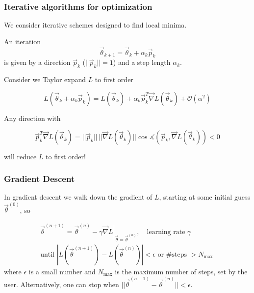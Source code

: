 \subsubsection{Iterative algorithms for optimization}

We consider iterative schemes designed to find local minima.

An iteration
\begin{equation}
    \vec{\theta}_{k+1} = \vec{\theta}_k + \alpha_k \vec{p}_k
\end{equation}
is given by a direction $\vec{p}_k$ ($||\vec{p}_k|| = 1$) and a step length $\alpha_k$.


Consider we Taylor expand $L$ to first order

\begin{equation}
    L(\vec{\theta}_k + \alpha_k \vec{p}_k) = L(\vec{\theta}_k) + \alpha_k \vec{p}_k^T \vec{\nabla} L(\vec{\theta}_k) + \mathcal{O}(\alpha^2)
\end{equation}

Any direction with

\begin{equation}
    \vec{p}_k^T \vec{\nabla} L(\vec{\theta}_k) = ||\vec{p}_k|| \, ||\vec{\nabla} L(\vec{\theta}_k)|| \cos{\measuredangle \left(\vec{p}_k, \vec{\nabla} L(\vec{\theta}_k)\right)} < 0
\end{equation}

will reduce $L$ to first order!

\subsubsection{Gradient Descent}


In gradient descent we walk down the gradient of $L$, starting at some initial guess $\vec{\theta}^{(0)}$, so

\begin{equation}
    \begin{gathered}
        \vec{\theta}^{(n+1)}=\vec{\theta}^{(n)}-\left.\gamma \vec{\nabla} L\right|_{\vec{\theta}=\vec{\theta}^{(n)}}, \quad \text{learning rate } \gamma \\
        \text{until } \left|L\left(\vec{\theta}^{(n+1)}\right)-L\left(\vec{\theta}^{(n)}\right)\right|<\epsilon \text{ or \# steps } >N_{\text {max }}
    \end{gathered}
\end{equation}
where $\epsilon$ is a small number and $N_{\text{max}}$ is the maximum number of steps, set by
the user. Alternatively, one can stop when $||\vec{\theta}^{(n+1)} - \vec{\theta}^{(n)}|| < \epsilon$.

